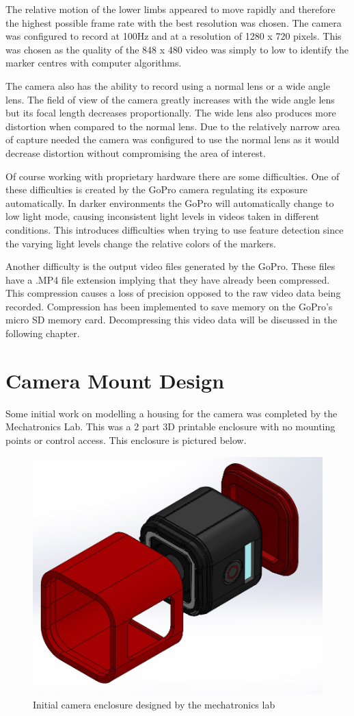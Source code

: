 The relative motion of the lower limbs appeared to move rapidly and therefore the highest possible frame rate with the best resolution was chosen. The camera was configured to record at 100Hz and at a resolution of 1280 x 720 pixels. This was chosen as the quality of the 848 x 480 video was simply to low to identify the marker centres with computer algorithms.

The camera also has the ability to record using a normal lens or a wide angle lens. The field of view of the camera greatly increases with the wide angle lens but its focal length decreases proportionally. The wide lens also produces more distortion when compared to the normal lens. Due to the relatively narrow area of capture needed the camera was configured to use the normal lens as it would decrease distortion without compromising the area of interest.

Of course working with proprietary hardware there are some difficulties. One of these difficulties is created by the GoPro camera regulating its exposure automatically. In darker environments the GoPro will automatically change to low light mode, causing inconsistent light levels in videos taken in different conditions. This introduces difficulties when trying to use feature detection since the varying light levels change the relative colors of the markers.

Another difficulty is the output video files generated by the GoPro. These files have a .MP4 file extension implying that they have already been compressed. This compression causes a loss of precision opposed to the raw video data being recorded. Compression has been implemented to save memory on the GoPro's micro SD memory card. Decompressing this video data will be discussed in the following chapter.


\section{Camera Mount Design}
Some initial work on modelling a housing for the camera was completed by the Mechatronics Lab. This was a 2 part 3D printable enclosure with no mounting points or control access. This enclosure is pictured below.

\begin{figure}[!ht] 
\captionsetup{width=0.6\linewidth, font=small}  
\includegraphics[width=0.6\linewidth]{figures/sylvanexploded.JPG}
\caption{Initial camera enclosure designed by the mechatronics lab}
\label{fig:sylvanexploded}
\end{figure}

